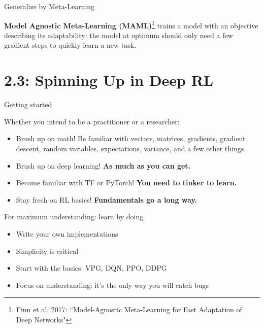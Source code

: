 \documentclass[9pt]{beamer}
\begin{document}
\begin{frame}{Generalize by Meta-Learning}

\textbf{Model Agnostic Meta-Learning (MAML)}\footnote{Finn et al, 2017: ``Model-Agnostic Meta-Learning for Fast Adaptation of Deep Networks"} trains a model with an objective describing its adaptability: the model at optimum should only need a few gradient steps to quickly learn a new task.

\end{frame}

\section{2.3: Spinning Up in Deep RL}

\begin{frame}{Getting started}

Whether you intend to be a practitioner or a researcher:
\begin{itemize}
\item Brush up on math! Be familiar with vectors, matrices, gradients, gradient descent, random variables, expectations, variance, and a few other things.
\item Brush up on deep learning! \textbf{As much as you can get.}
\item Become familiar with TF or PyTorch! \textbf{You need to tinker to learn.}
\item Stay fresh on RL basics! \textbf{Fundamentals go a long way.}
\end{itemize}

\end{frame}

\begin{frame}{For maximum understanding: learn by doing}

\begin{itemize}
\item Write your own implementations
\item Simplicity is critical
\item Start with the basics: VPG, DQN, PPO, DDPG
\item Focus on understanding: it's the only way you will catch bugs
\end{itemize}
\end{frame}
\end{document}
